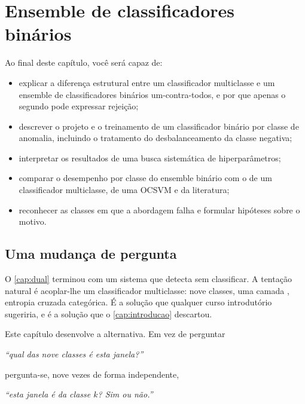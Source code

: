 \chapter{Ensemble de classificadores binários}
\label{cap:binarios}

\begin{objetivos}
Ao final deste capítulo, você será capaz de:
\begin{itemize}[leftmargin=*,itemsep=0.2em]
  \item explicar a diferença estrutural entre um classificador multiclasse e um ensemble
        de classificadores binários um-contra-todos, e por que apenas o segundo pode
        expressar rejeição;
  \item descrever o projeto e o treinamento de um classificador binário por classe de
        anomalia, incluindo o tratamento do desbalanceamento da classe negativa;
  \item interpretar os resultados de uma busca sistemática de hiperparâmetros;
  \item comparar o desempenho por classe do ensemble binário com o de um classificador
        multiclasse, de uma OCSVM e da literatura;
  \item reconhecer as classes em que a abordagem falha e formular hipóteses sobre o
        motivo.
\end{itemize}
\end{objetivos}

\section{Uma mudança de pergunta}

O \cref{cap:dual} terminou com um sistema que detecta sem classificar. A tentação
natural é acoplar-lhe um classificador multiclasse: nove classes, uma camada
, entropia cruzada categórica. É a solução que qualquer curso introdutório
sugeriria, e é a solução que o \cref{cap:introducao} descartou.

Este capítulo desenvolve a alternativa. Em vez de perguntar

\begin{center}
\emph{``qual das nove classes é esta janela?''}
\end{center}

\noindent
pergunta-se, nove vezes de forma independente,

\begin{center}
\emph{``esta janela é da classe $k$? Sim ou não.''}
\end{center}

